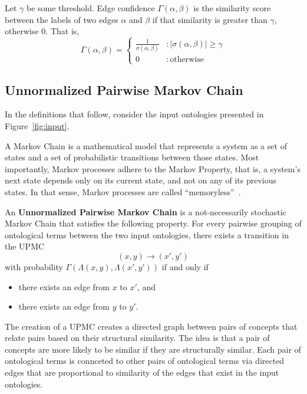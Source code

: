 \documentclass[letterpaper,twocolumn,12pt]{article}
\begin{document}
\begin{defn}
\label{edgeconfidence}
Let $\gamma$ be some threshold. Edge confidence $\Gamma \left( \alpha, \beta \right)$ is the similarity score between the labels of two edges $\alpha$ and $\beta$ if that similarity is greater than $\gamma$, otherwise $0$. That is,
$$ \Gamma \left( \alpha, \beta \right) = \left\{
   	 \begin{array}{ll}
           \frac{1}{\sigma \left( \alpha, \beta \right)} & : \vert \sigma \left( \alpha, \beta \right) \vert \geq \gamma \\
           0                                             & : \mathrm{otherwise}
     \end{array}
   \right.$$
\end{defn}

\subsection{Unnormalized Pairwise Markov Chain}
In the definitions that follow, consider the input ontologies presented in Figure~\ref{fig:input}.

A Markov Chain is a mathematical model that represents a system as a set of states and a set of probabilistic transitions between those states. 
Most importantly, Markov processes adhere to the Markov Property, that is, a system's next state depends only on its current state, and not on any of its previous states. 
In that sense, Markov processes are called ``memoryless''~\cite{bcnn:2010:simulation}.

\begin{defn}
An {\bf Unnormalized Pairwise Markov Chain} is a not-necessarily stochastic Markov Chain that satisfies the following property.
For every pairwise grouping of ontological terms between the two input ontologies, there exists a transition in the UPMC
$$ (x, y) \rightarrow (x', y') $$
with probability $\Gamma(\Lambda(x, y), \Lambda(x', y'))$ if and only if
\begin{itemize}
\item there exists an edge from $x$ to $x'$, and
\item there exists an edge from $y$ to $y'$.
\end{itemize}
\end{defn}

The creation of a UPMC creates a directed graph between pairs of concepts that relate pairs based on their structural similarity.
The idea is that a pair of concepts are more likely to be similar if they are structurally similar.
Each pair of ontological terms is connceted to other pairs of ontological terms via directed edges that are proportional to similarity of the edges that exist in the input ontologies. 
\end{document}
